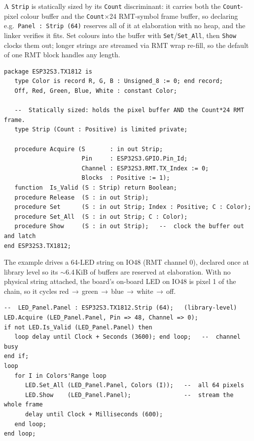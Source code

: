 A \texttt{Strip} is statically sized by its \texttt{Count} discriminant: it carries
both the \texttt{Count}-pixel colour buffer and the \texttt{Count}$\times$24
RMT-symbol frame buffer, so declaring e.g.\ \texttt{Panel : Strip (64)} reserves all
of it at elaboration with no heap, and the linker verifies it fits. Set colours into
the buffer with \texttt{Set}/\texttt{Set\_All}, then \texttt{Show} clocks them out;
longer strings are streamed via RMT wrap re-fill, so the default of one RMT block
handles any length.

\begin{lstlisting}
package ESP32S3.TX1812 is
   type Color is record R, G, B : Unsigned_8 := 0; end record;
   Off, Red, Green, Blue, White : constant Color;

   --  Statically sized: holds the pixel buffer AND the Count*24 RMT frame.
   type Strip (Count : Positive) is limited private;

   procedure Acquire (S       : in out Strip;
                      Pin     : ESP32S3.GPIO.Pin_Id;
                      Channel : ESP32S3.RMT.TX_Index := 0;
                      Blocks  : Positive := 1);
   function  Is_Valid (S : Strip) return Boolean;
   procedure Release  (S : in out Strip);
   procedure Set      (S : in out Strip; Index : Positive; C : Color);
   procedure Set_All  (S : in out Strip; C : Color);
   procedure Show     (S : in out Strip);   --  clock the buffer out and latch
end ESP32S3.TX1812;
\end{lstlisting}

The example drives a 64-LED string on IO48 (RMT channel 0), declared once at
library level so its $\sim$6.4\,KiB of buffers are reserved at elaboration. With no
physical string attached, the board's on-board LED on IO48 is pixel 1 of the chain,
so it cycles red\,$\rightarrow$\,green\,$\rightarrow$\,blue\,$\rightarrow$\,white\,$\rightarrow$\,off.

\begin{lstlisting}
--  LED_Panel.Panel : ESP32S3.TX1812.Strip (64);   (library-level)
LED.Acquire (LED_Panel.Panel, Pin => 48, Channel => 0);
if not LED.Is_Valid (LED_Panel.Panel) then
   loop delay until Clock + Seconds (3600); end loop;   --  channel busy
end if;
loop
   for I in Colors'Range loop
      LED.Set_All (LED_Panel.Panel, Colors (I));   --  all 64 pixels
      LED.Show    (LED_Panel.Panel);               --  stream the whole frame
      delay until Clock + Milliseconds (600);
   end loop;
end loop;
\end{lstlisting}

